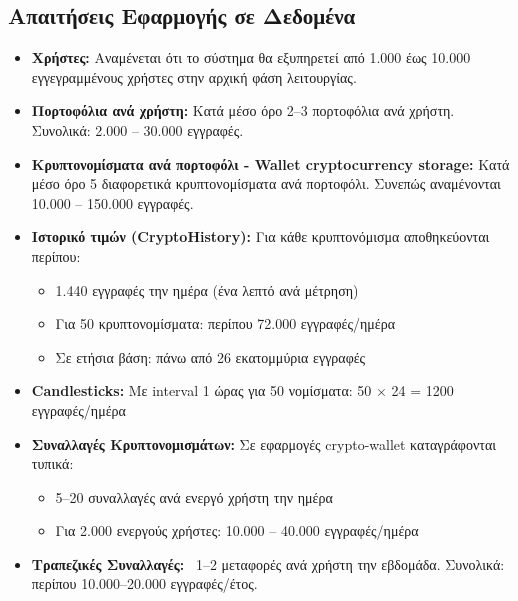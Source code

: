 \subsection{Απαιτήσεις Εφαρμογής σε Δεδομένα}
\begin{itemize}

  \item \textbf{Χρήστες:} 
  Αναμένεται ότι το σύστημα θα εξυπηρετεί από 1.000 έως 10.000 εγγεγραμμένους χρήστες 
  στην αρχική φάση λειτουργίας.

  \item \textbf{Πορτοφόλια ανά χρήστη:} 
  Κατά μέσο όρο 2--3 πορτοφόλια ανά χρήστη. 
  Συνολικά: 2.000 -- 30.000 εγγραφές.

  \item \textbf{Κρυπτονομίσματα ανά πορτοφόλι - Wallet cryptocurrency storage:} 
  Κατά μέσο όρο 5 διαφορετικά κρυπτονομίσματα ανά πορτοφόλι.  
  Συνεπώς αναμένονται 10.000 -- 150.000 εγγραφές.

  \item \textbf{Ιστορικό τιμών (CryptoHistory):}  
  Για κάθε κρυπτονόμισμα αποθηκεύονται περίπου:
  \begin{itemize}
    \item 1.440 εγγραφές την ημέρα (ένα λεπτό ανά μέτρηση)
    \item Για 50 κρυπτονομίσματα: περίπου 72.000 εγγραφές/ημέρα
    \item Σε ετήσια βάση: πάνω από 26 εκατομμύρια εγγραφές
  \end{itemize}

  \item \textbf{Candlesticks:}  
  Με interval 1 ώρας για 50 νομίσματα: 
  50 \(\times\) 24 = 1200 εγγραφές/ημέρα

  \item \textbf{Συναλλαγές Κρυπτονομισμάτων:}  
  Σε εφαρμογές crypto-wallet καταγράφονται τυπικά:
  \begin{itemize}
    \item 5--20 συναλλαγές ανά ενεργό χρήστη την ημέρα
    \item Για 2.000 ενεργούς χρήστες: 10.000 -- 40.000 εγγραφές/ημέρα
  \end{itemize}

  \item \textbf{Τραπεζικές Συναλλαγές:}  
  ~1--2 μεταφορές ανά χρήστη την εβδομάδα.
  Συνολικά: περίπου 10.000--20.000 εγγραφές/έτος.

\end{itemize}

\newpage
